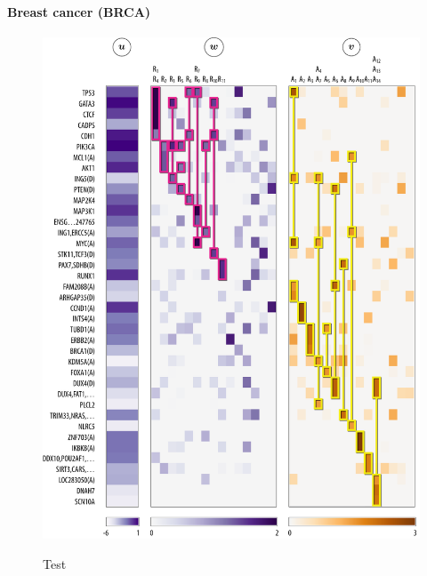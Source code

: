 \paragraph{Breast cancer (BRCA)}

\begin{figure}[htbp]
\centering
\includegraphics[width=\textwidth]{figures/genes/mat_brca.pdf}\\[2em]
\caption{Test}
\end{figure}

